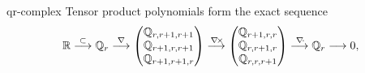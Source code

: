 \begin{Lemma}{qr-complex}
  Tensor product polynomials form the exact sequence
  \begin{gather*}
    \mathbb R
    \overset{\subset}{\longrightarrow} \mathbb Q_r
    \overset{\nabla}{\longrightarrow}
    \begin{pmatrix}
      \mathbb Q_{r,r+1,r+1}\\\mathbb Q_{r+1,r,r+1}\\\mathbb Q_{r+1,r+1,r}
    \end{pmatrix}
    \overset{\nabla\!\times\!}{\longrightarrow}
    \begin{pmatrix}
      \mathbb Q_{r+1,r,r}\\\mathbb Q_{r,r+1,r}\\\mathbb Q_{r,r,r+1}
    \end{pmatrix}
    \overset{\nabla\!\cdot\!}{\longrightarrow}
    \mathbb Q_r
    \longrightarrow 0,    
  \end{gather*}
\end{Lemma}

